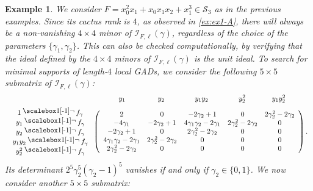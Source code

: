 \documentclass{amsart}
\theoremstyle{plain}
\newtheorem{example}[example]{Example}
\renewcommand{\k}{\Bbbk}
\renewcommand{\S}{\mathcal{S}}
\def\c{\gamma}
\newcommand{\ideal}[1]{\mathopen{}\bigl( #1 \bigr)\mathclose{}}
\newcommand{\contract}{\mathbin{\mathpalette\dointprod\relax}}
\newcommand{\dointprod}[2]{%
  \raisebox{\depth}{\scalebox{1}[-1]{$#1\lnot$}}}
\def\\k{{\mathsf{k}}}
\numberwithin{equation}{section}
\begin{document}
\begin{example} \label{ex:ex1-C}
    We consider $F = x_0^2x_1 + x_0x_1x_2 + x_1^3 \in \S_3$ as in the previous examples.
    Since its cactus rank is $4$, as observed in \cref{ex:ex1-A}, there will always be a non-vanishing $4 \times 4$ minor of $\mathcal{I}_{F,\ell}(\gamma)$, regardless of the choice of the parameters $\{\gamma_1,\gamma_2\}$.
    This can also be checked computationally, by verifying that the ideal defined by the $4 \times 4$ minors of $\mathcal{I}_{F,\ell}(\gamma)$ is the unit ideal. %
    To search for minimal supports of length-$4$ local GADs, we consider the following $5\times5$ submatrix of $\mathcal{I}_{F,\ell}(\gamma)$:
\[
\begin{array}{c@{\;}c}
&
\begin{array}{ccccc}
\hspace{0.5cm} y_1 \hspace{1.25cm} & y_2 \hspace{1.15cm} & y_1y_2 \hspace{1.15cm} & y_2^2 \hspace{0.95cm} & y_1y_2^2 \hspace{0.35cm}
\end{array}
\\[6pt]
\begin{array}{c}
1\contract f_{\c}\\
y_1\contract f_{\c}\\
y_2\contract f_{\c}\\
y_1y_2\contract f_{\c}\\
y_2^2\contract f_{\c}
\end{array}
&
\left(
\begin{array}{ccccc}
2 & 0 & -2\gamma_2+1 & 0 & 2\gamma_2^2-2\gamma_2 \\
-4\gamma_1 & -2\gamma_2+1 & 4\gamma_1\gamma_2-2\gamma_1 & 2\gamma_2^2-2\gamma_2 & 0 \\
-2\gamma_2+1 & 0 & 2\gamma_2^2-2\gamma_2 & 0 & 0 \\
4\gamma_1\gamma_2-2\gamma_1 & 2\gamma_2^2-2\gamma_2 & 0 & 0 & 0 \\
2\gamma_2^2-2\gamma_2 & 0 & 0 & 0 & 0
\end{array}
\right).
\end{array}
\]
Its determinant $2^5\gamma_2^5(\gamma_2-1)^5$ vanishes if and only if $\gamma_2 \in \{0,1\}$.
We now consider another $5 \times 5$ submatrix:
\[
\begin{array}{c@{\;}c}
&
\begin{array}{ccccc}

\end{array}
\end{array}\]
\end{example}
\end{document}

